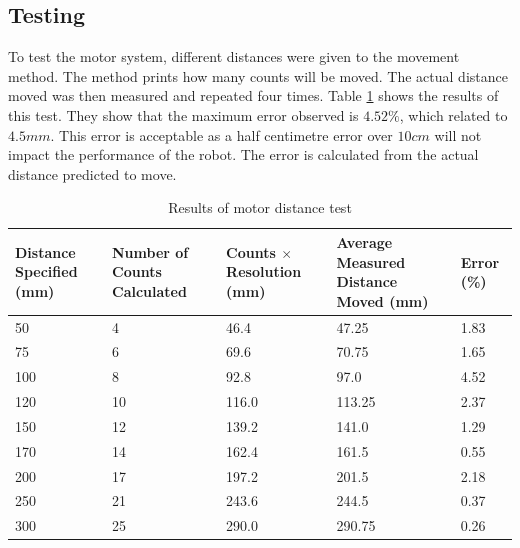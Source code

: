 \subsection{Testing}\label{Section:MotorTest}

To test the motor system, different distances were given to the movement method. The method prints how many counts will be moved. The actual distance moved was then measured and repeated four times. Table \ref{table:results:motor:distance} shows the results of this test. They show that the maximum error observed is $4.52\%$, which related to $4.5mm$. This error is acceptable as a half centimetre error over $10cm$ will not impact the performance of the robot. The error is calculated from the actual distance predicted to move. 


\begin{table}
\caption{Results of motor distance test}
\label{table:results:motor:distance}
\begin{tabular}{p{2.5cm}p{2.5cm}p{2.5cm}p{2.5cm}p{2.5cm}} \toprule
\textbf{Distance Specified (mm)} &	\textbf{Number of Counts Calculated}	& \textbf{Counts $\times$ Resolution (mm)}	& 	\textbf{Average Measured Distance Moved (mm)}	&	\textbf{Error (\%)} \\ \toprule
50						&	4							&	46.4							&	47.25									&	1.83		\\ \midrule
75						&	6							&	69.6							&	70.75									&	1.65		\\ \midrule
100						&	8							&	92.8							&	97.0									&	4.52		\\ \midrule
120						&	10							&	116.0							&	113.25									&	2.37		\\ \midrule
150						&	12							&	139.2							&	141.0									&	1.29		\\ \midrule
170						&	14							&	162.4							&	161.5									&	0.55		\\ \midrule
200						&	17							&	197.2							&	201.5									&	2.18		\\ \midrule
250						&	21							&	243.6							&	244.5									&	0.37		\\ \midrule
300						&	25							&	290.0							&	290.75									&	0.26		\\ \bottomrule
\end{tabular}
\end{table}


